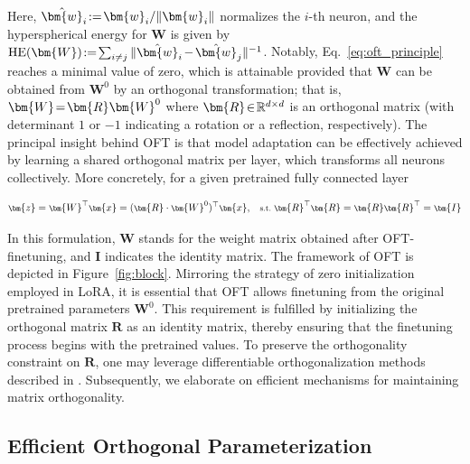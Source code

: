 Here, $\thickmuskip=2mu \medmuskip=2mu \hat{\bm{w}}_i:=\bm{w}_i/\|\bm{w}_i\|$ normalizes the $i$-th neuron, and the hyperspherical energy for $\bm{W}$ is given by $\thickmuskip=2mu \medmuskip=2mu \text{HE}(\bm{W}):= \sum_{i\neq j} \|\hat{\bm{w}}_i-\hat{\bm{w}}_j\|^{-1}$. Notably, Eq.~\eqref{eq:oft_principle} reaches a minimal value of zero, which is attainable provided that $\bm{W}$ can be obtained from $\bm{W}^0$ by an orthogonal transformation; that is, $\thickmuskip=2mu \medmuskip=2mu \bm{W}=\bm{R}\bm{W}^0$ where $\thickmuskip=2mu \medmuskip=2mu \bm{R}\in\mathbb{R}^{d\times d}$ is an orthogonal matrix (with determinant $1$ or $-1$ indicating a rotation or a reflection, respectively). The principal insight behind OFT is that model adaptation can be effectively achieved by learning a shared orthogonal matrix per layer, which transforms all neurons collectively. More concretely, for a given pretrained fully connected layer

\begin{equation}\label{eq:oft_general}
    \footnotesize
    \bm{z}=\bm{W}^\top\bm{x}=(\bm{R}\cdot\bm{W}^0)^\top\bm{x},~~~\text{s.t.}~\bm{R}^\top\bm{R}=\bm{R}\bm{R}^\top=\bm{I}
\end{equation}

In this formulation, $\bm{W}$ stands for the weight matrix obtained after OFT-finetuning, and $\bm{I}$ indicates the identity matrix. The framework of OFT is depicted in Figure~\ref{fig:block}. Mirroring the strategy of zero initialization employed in LoRA, it is essential that OFT allows finetuning from the original pretrained parameters $\bm{W}^0$. This requirement is fulfilled by initializing the orthogonal matrix $\bm{R}$ as an identity matrix, thereby ensuring that the finetuning process begins with the pretrained values. To preserve the orthogonality constraint on $\bm{R}$, one may leverage differentiable orthogonalization methods described in \cite{liu2021orthogonal,lezcano2019cheap}. Subsequently, we elaborate on efficient mechanisms for maintaining matrix orthogonality.

\subsection{Efficient Orthogonal Parameterization}\label{sect:eff_ortho}

